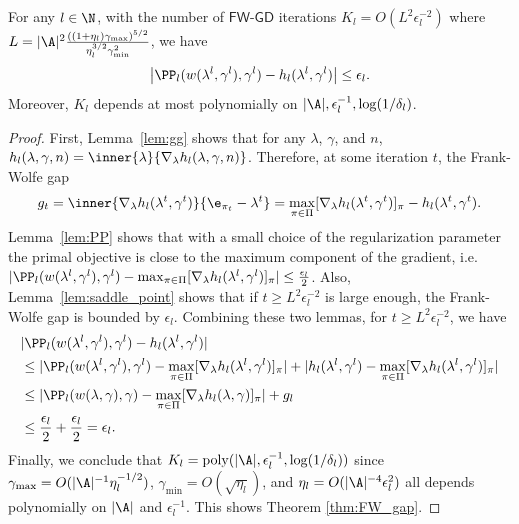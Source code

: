 \documentclass{article}
\newcommand{\lalit}[1]{\textcolor{blue}{}}
\newcommand{\1}{\mathbf{1}}
\begin{document}
\begin{theorem}\label{thm:FW_gap}
For any $l\in\N$, with the number of $\textsf{FW-GD}$ iterations $K_l=O(L^2\epsilon_l^{-2})$ where $L=|\A|^2\frac{((1+\eta_l)\gamma_{\max})^{5/2}}{\eta_l^{3/2}\gamma_{\min}^2}$, we have
\begin{align*}
    \big|\PP_l(w(\lambda^{l},\gamma^l),\gamma^l)-h_l(\lambda^{l},\gamma^l)\big|\leq \epsilon_l.
\end{align*}
Moreover, $K_l$ depends at most polynomially on $|\A|,\epsilon_l^{-1},\log(1/\delta_l)$. 
\end{theorem}
\begin{proof}
First, Lemma~\ref{lem:gg} shows that for any $\lambda$, $\gamma$, and $n$,  $h_l(\lambda,\gamma,n)=\inner{\lambda}{\nabla_\lambda h_l(\lambda,\gamma,n)}$. Therefore, at some iteration $t$, the Frank-Wolfe gap
\[g_t=\inner{\nabla_\lambda h_{l}(\lambda^{t},\gamma^{t})}{\e_{\pi_t}-\lambda^{t}}=\max_{\pi\in\Pi}[\nabla_\lambda h_{l}(\lambda^{t},\gamma^{t})]_\pi-h_{l}(\lambda^{t},\gamma^{t}).\] 
Lemma~\ref{lem:PP} shows that with a small choice of the regularization parameter the primal objective is close to the maximum component of the gradient, i.e. $|\PP_l(w(\lambda^l,\gamma^l),\gamma^l)-\max_{\pi\in\Pi}[\nabla_\lambda h_l(\lambda^l, \gamma^l)]_\pi| \leq \frac{\epsilon_l}{2}$. Also, 
Lemma~\ref{lem:saddle_point} shows that if $t\geq L^2\epsilon_l^{-2}$ is large enough, the Frank-Wolfe gap is bounded by $\epsilon_l$. 
Combining these two lemmas, for $t\geq L^2\epsilon_l^{-2}$, we have 
\begin{align*}
    &|\PP_l(w(\lambda^{l},\gamma^l),\gamma^l)-h_l(\lambda^{l},\gamma^l)|\\
    &\leq |\PP_l(w(\lambda^{l},\gamma^l),\gamma^l)-\max_{\pi\in\Pi}[\nabla_\lambda h_l(\lambda^{l}, \gamma^l)]_\pi| + |h_{l}(\lambda^{l},\gamma^l)-\max_{\pi\in\Pi}[\nabla_\lambda h_{l}(\lambda^{l},\gamma^l)]_\pi|\\
    &\leq |\PP_l(w(\lambda,\gamma),\gamma)-\max_{\pi\in\Pi}[\nabla_\lambda h_l(\lambda, \gamma)]_\pi|+g_l\\
    &\leq \frac{\epsilon_l}{2}+\frac{\epsilon_l}{2}=\epsilon_l.
\end{align*}
Finally, we conclude that $K_l=\operatorname{poly}(|\A|,\epsilon_l^{-1},\log(1/\delta_l))$ since $\gamma_{\max}=O(|\A|^{-1}\eta_l^{-1/2})$, $\gamma_{\min}=O(\sqrt{\eta_l})$, and $\eta_l=O(|\A|^{-4}\epsilon_l^2)$ all depends polynomially on $|\A|$ and $\epsilon_l^{-1}$. This shows Theorem \ref{thm:FW_gap}. 
\end{proof}
\end{document}
